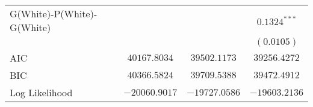 \begin{center}
\begin{longtable}{l c c c}
G(White)-P(White)-G(White) &                &                 & $0.1324^{***}$  \\
                           &                &                 & $(0.0105)$      \\
\midrule
AIC                        & $40167.8034$   & $39502.1173$    & $39256.4272$    \\
BIC                        & $40366.5824$   & $39709.5388$    & $39472.4912$    \\
Log Likelihood             & $-20060.9017$  & $-19727.0586$   & $-19603.2136$   \\
\end{longtable}
\end{center}

